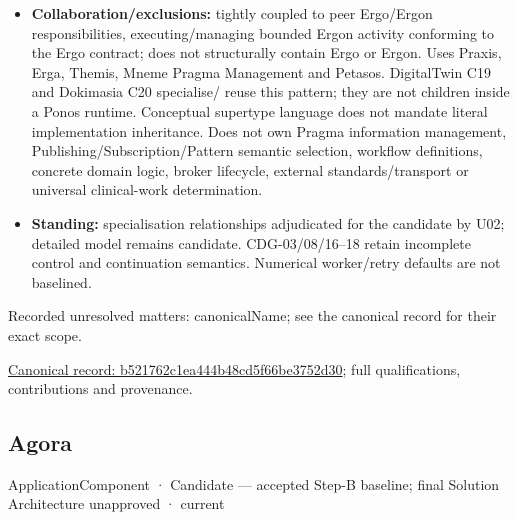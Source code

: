 \begin{itemize}
\item \textbf{Collaboration/exclusions:} tightly coupled to peer Ergo/Ergon responsibilities,
  executing/managing bounded Ergon activity conforming to the Ergo contract;
  does not structurally contain Ergo or Ergon. Uses Praxis, Erga, Themis, Mneme
  Pragma Management and Petasos. DigitalTwin C19 and Dokimasia C20 specialise/
  reuse this pattern; they are not children inside a Ponos runtime. Conceptual
  supertype language does not mandate literal implementation inheritance.
  Does not own Pragma information management, Publishing/Subscription/Pattern
  semantic selection, workflow definitions, concrete domain logic, broker lifecycle,
  external standards/transport or universal clinical-work determination.

\item \textbf{Standing:} specialisation relationships adjudicated for the candidate by U02;
  detailed model remains candidate. CDG-03/08/16–18 retain incomplete control
  and continuation semantics. Numerical worker/retry defaults are not baselined.

\end{itemize}

{\small Recorded unresolved matters: canonicalName; see the canonical record for their exact scope.}\par
{\footnotesize \href{../../../../continuum/application/application-component/b521762c1ea444b48cd5f66be3752d30.md}{Canonical record: b521762c1ea444b48cd5f66be3752d30}; full qualifications, contributions and provenance.}\par
\subsection{Agora}

\label{element:d1c4053e68384080b8eb79d2008632ba}
{\small ApplicationComponent · Candidate — accepted Step-B baseline; final Solution Architecture unapproved · current}\par

